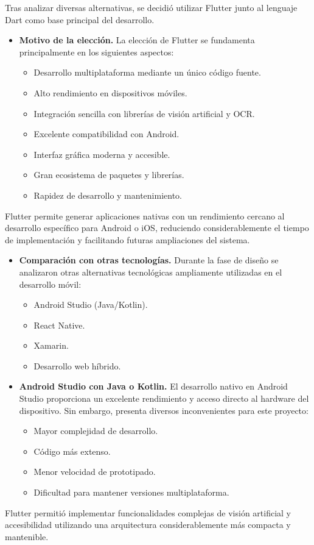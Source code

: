 Tras analizar diversas alternativas, se decidió utilizar Flutter junto al lenguaje Dart como base principal del desarrollo.

\begin{itemize}
	
	\item\textbf{Motivo de la elección.} La elección de Flutter se fundamenta principalmente en los siguientes aspectos:
	\begin{itemize}[noitemsep]
		\item Desarrollo multiplataforma mediante un único código fuente.
		\item Alto rendimiento en dispositivos móviles.
		\item Integración sencilla con librerías de visión artificial y OCR.
		\item Excelente compatibilidad con Android.
		\item Interfaz gráfica moderna y accesible.
		\item Gran ecosistema de paquetes y librerías.
		\item Rapidez de desarrollo y mantenimiento.
	\end{itemize}
\end{itemize}

Flutter permite generar aplicaciones nativas con un rendimiento cercano al desarrollo específico para Android o iOS, reduciendo considerablemente el tiempo de implementación y facilitando futuras ampliaciones del sistema.

\begin{itemize}
	\item\textbf{Comparación con otras tecnologías.} Durante la fase de diseño se analizaron otras alternativas tecnológicas ampliamente utilizadas en el desarrollo móvil:
	\begin{itemize}[noitemsep]
		\item Android Studio (Java/Kotlin).
		\item React Native.
		\item Xamarin.
		\item Desarrollo web híbrido.
	\end{itemize}
\end{itemize}

\begin{itemize}
	\item \textbf{Android Studio con Java o Kotlin.} El desarrollo nativo en Android Studio proporciona un excelente rendimiento y acceso directo al hardware del dispositivo. Sin embargo, presenta diversos inconvenientes para este proyecto:
	
	\begin{itemize}[noitemsep]
		\item Mayor complejidad de desarrollo.
		\item Código más extenso.
		\item Menor velocidad de prototipado.
		\item Dificultad para mantener versiones multiplataforma.
	\end{itemize}
\end{itemize}
Flutter permitió implementar funcionalidades complejas de visión artificial y accesibilidad utilizando una arquitectura considerablemente más compacta y mantenible.

